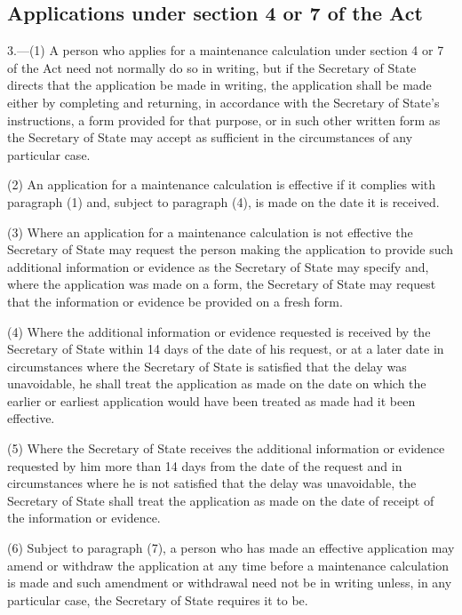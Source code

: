 \documentclass[12pt,a4paper]{article}
\begin{document}
\renewcommand\parthead{--- Part II}

\subsection[3. Applications under section 4 or 7 of the Act]{Applications under section 4 or 7 of the Act}

3.---(1)  A person who applies for a maintenance calculation under section 4 or 7 of the Act need not normally do so in writing, but if the Secretary of State directs that the application be made in writing, the application shall be made either by completing and returning, in accordance with the Secretary of State’s instructions, a form provided for that purpose, or in such other written form as the Secretary of State may accept as sufficient in the circumstances of any particular case.

(2) An application for a maintenance calculation is effective if it complies with paragraph (1) and, subject to paragraph (4), is made on the date it is received.

(3) Where an application for a maintenance calculation is not effective the Secretary of State may request the person making the application to provide such additional information or evidence as the Secretary of State may specify and, where the application was made on a form, the Secretary of State may request that the information or evidence be provided on a fresh form.

(4) Where the additional information or evidence requested is received by the Secretary of State within 14 days of the date of his request, or at a later date in circumstances where the Secretary of State is satisfied that the delay was unavoidable, he shall treat the application as made on the date on which the earlier or earliest application would have been treated as made had it been effective.

(5) Where the Secretary of State receives the additional information or evidence requested by him more than 14 days from the date of the request and in circumstances where he is not satisfied that the delay was unavoidable, the Secretary of State shall treat the application as made on the date of receipt of the information or evidence.

(6) Subject to paragraph (7), a person who has made an effective application may amend or withdraw the application at any time before a maintenance calculation is made and such amendment or withdrawal need not be in writing unless, in any particular case, the Secretary of State requires it to be.
\end{document}

